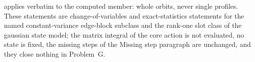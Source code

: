 applies verbatim to the computed member: whole orbits, never single profiles. These statements are change-of-variables and exact-statistics statements for the named constant-variance edge-block subclass and the rank-one slot class of the gaussian state model; the matrix integral of the core action is not evaluated, no state is fixed, the missing steps of the Missing step paragraph are unchanged, and they close nothing in Problem~G.
